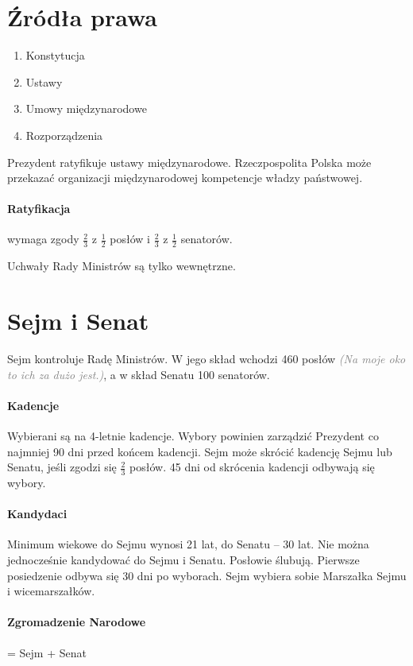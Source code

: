 \documentclass [a4paper, 12pt, oneside]{article}
\newcommand{\comment}[1]{\textcolor{Gray}{\textsf{\emph{(#1)}}}}
\begin{document}
\section{Źródła prawa} %
\label{sec:_r_d_a_prawa}
    \begin{enumerate}
        \item Konstytucja
        \item Ustawy
        \item Umowy międzynarodowe
        \item Rozporządzenia
    \end{enumerate}
    Prezydent ratyfikuje ustawy międzynarodowe. Rzeczpospolita Polska może przekazać organizacji międzynarodowej kompetencje władzy państwowej.

    \paragraph{Ratyfikacja} wymaga zgody $\frac23$ z $\frac12$ posłów i $\frac23$ z $\frac12$ senatorów.

    Uchwały Rady Ministrów są tylko wewnętrzne.

\section{Sejm i Senat} %
\label{sec:sejm_i_senat}
    Sejm kontroluje Radę Ministrów. W jego skład wchodzi 460 posłów \comment{Na moje oko to ich za dużo jest.}, a w skład Senatu 100 senatorów.

    \paragraph{Kadencje} Wybierani są na 4-letnie kadencje. Wybory powinien zarządzić Prezydent co najmniej 90 dni przed końcem kadencji. Sejm może skrócić kadencję Sejmu lub Senatu, jeśli zgodzi się $\frac23$ posłów. 45 dni od skrócenia kadencji odbywają się wybory.

    \paragraph{Kandydaci} Minimum wiekowe do Sejmu wynosi 21 lat, do Senatu -- 30 lat. Nie można jednocześnie kandydować do Sejmu i Senatu. Posłowie ślubują. Pierwsze posiedzenie odbywa się 30 dni po wyborach. Sejm wybiera sobie Marszałka Sejmu i wicemarszałków.

    \paragraph{Zgromadzenie Narodowe} = Sejm + Senat
\end{document}
